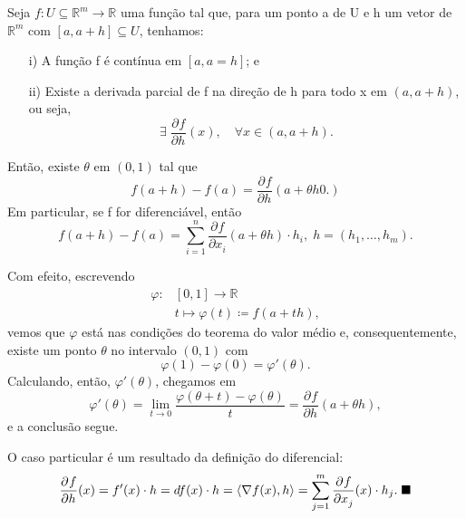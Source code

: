 \documentclass[../analysisII_notes.tex]{subfiles}
\begin{document}
\begin{lemma*}
	Seja \(f:U\subseteq \mathbb{R}^{m}\rightarrow \mathbb{R}\) uma função tal que, para um ponto a de U e h um vetor de \(\mathbb{R}^{m}\) com \([a, a+h]\subseteq U\), tenhamos:
	\begin{itemize}
		\item[i)] A função f é contínua em \([a, a=h]\); e
		\item[ii)] Existe a derivada parcial de f na direção de h para todo x em \((a, a+h)\), ou seja,
		      \[
			      \exists\; \frac{\partial^{}f}{\partial h^{}}(x),\quad \forall x\in (a,a+h).
		      \]
	\end{itemize}
	Então, existe \(\theta \) em \((0, 1)\) tal que
	\[
		f(a+h) - f(a) = \frac{\partial^{}f}{\partial h^{}}(a+\theta h0.)
	\]
	Em particular, se f for diferenciável, então
	\[
		f(a+h) - f(a) = \sum\limits_{i=1}^{n}\frac{\partial^{}f}{\partial x_{i}^{}}(a+\theta h)\cdot h_{i},\; h = (h_1, \dotsc , h_{m}).
	\]
\end{lemma*}
\begin{proof*}
	Com efeito, escrevendo
	\begin{align*}
		\varphi : & [0, 1]\rightarrow \mathbb{R}           \\
		          & t\mapsto \varphi (t)\coloneqq f(a+th),
	\end{align*}
	vemos que \(\varphi \) está nas condições do teorema do valor médio e, consequentemente, existe um ponto \(\theta \) no intervalo \((0, 1)\) com
	\[
		\varphi (1) - \varphi (0) = \varphi '(\theta ).
	\]
	Calculando, então, \(\varphi '(\theta )\), chegamos em
	\[
		\varphi '(\theta ) = \lim_{t\to 0} \frac{\varphi (\theta +t) - \varphi(\theta )}{t} = \frac{\partial^{}f}{\partial h^{}}(a+\theta h),
	\]
	e a conclusão segue.

	O caso particular é um resultado da definição do diferencial:
	\[
		\frac{\partial^{}f}{\partial h^{}}(x) = f'(x)\cdot h = df(x)\cdot h = \left< \nabla f(x), h \right> = \sum\limits_{j=1}^{m}\frac{\partial^{}f}{\partial x_{j}^{}}(x)\cdot h_{j}.\; \text{$\blacksquare$}
	\]
\end{proof*}
\end{document}
